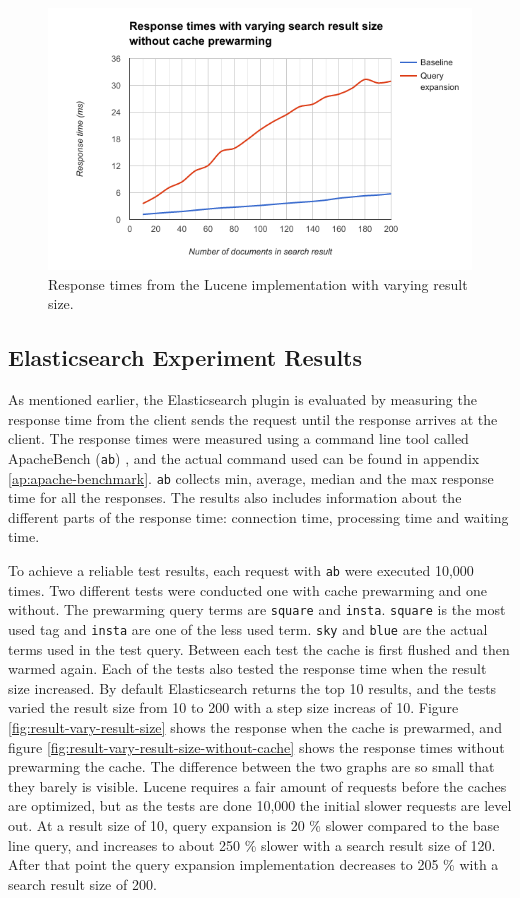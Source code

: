 \begin{figure}[h!]
  \centering \includegraphics[width=1\linewidth]{img/lucene-results.png}
  \caption{Response times from the Lucene implementation with varying result size.}
  \label{fig:lucene-results}
\end{figure}

\subsection{Elasticsearch Experiment Results}
As mentioned earlier,
the Elasticsearch plugin is evaluated by measuring the response time from the client sends the request until the response arrives at the client.
The response times were measured using a command line tool called ApacheBench (\texttt{ab}) \cite{apache-benchmark},
and the actual command used can be found in appendix \ref{ap:apache-benchmark}.
\texttt{ab} collects min, average, median and the max response time for all the responses.
The results also includes information about the different parts of the response time:
connection time, processing time and waiting time.

To achieve a reliable test results,
each request with \texttt{ab} were executed 10,000 times.
Two different tests were conducted one with cache prewarming and one without.
The prewarming query terms are \texttt{square} and \texttt{insta}.
\texttt{square} is the most used tag and \texttt{insta} are one of the less used term.
\texttt{sky} and \texttt{blue} are the actual terms used in the test query.
Between each test the cache is first flushed and then warmed again.
Each of the tests also tested the response time when the result size increased.
By default Elasticsearch returns the top 10 results,
and the tests varied the result size from 10 to 200 with a step size increas of 10.
Figure \ref{fig:result-vary-result-size} shows the response when the cache is prewarmed,
and figure \ref{fig:result-vary-result-size-without-cache} shows the response times without prewarming the cache.
The difference between the two graphs are so small that they barely is visible.
Lucene requires a fair amount of requests before the caches are optimized,
but as the tests are done 10,000 the initial slower requests are level out.
At a result size of 10, query expansion is 20 \% slower compared to the base line query,
and increases to about 250 \% slower with a search result size of 120.
After that point the query expansion implementation decreases to 205 \% with a search result size of 200.

